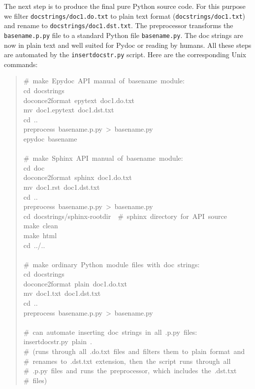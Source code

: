 \documentclass[a4paper,english]{article}
\begin{document}
The next step is to produce the final pure Python source code. For
this purpose we filter \texttt{docstrings/doc1.do.txt} to plain text format
(\texttt{docstrings/doc1.txt}) and rename to \texttt{docstrings/doc1.dst.txt}. The
preprocessor transforms the \texttt{basename.p.py} file to a standard Python
file \texttt{basename.py}. The doc strings are now in plain text and well
suited for Pydoc or reading by humans. All these steps are automated
by the \texttt{insertdocstr.py} script.  Here are the corresponding Unix
commands:
%
\begin{quote}{\ttfamily \raggedright \noindent
\#~make~Epydoc~API~manual~of~basename~module:\\
cd~docstrings\\
doconce2format~epytext~doc1.do.txt\\
mv~doc1.epytext~doc1.dst.txt\\
cd~..\\
preprocess~basename.p.py~>~basename.py\\
epydoc~basename\\
~\\
\#~make~Sphinx~API~manual~of~basename~module:\\
cd~doc\\
doconce2format~sphinx~doc1.do.txt\\
mv~doc1.rst~doc1.dst.txt\\
cd~..\\
preprocess~basename.p.py~>~basename.py\\
cd~docstrings/sphinx-rootdir~~\#~sphinx~directory~for~API~source\\
make~clean\\
make~html\\
cd~../..\\
~\\
\#~make~ordinary~Python~module~files~with~doc~strings:\\
cd~docstrings\\
doconce2format~plain~doc1.do.txt\\
mv~doc1.txt~doc1.dst.txt\\
cd~..\\
preprocess~basename.p.py~>~basename.py\\
~\\
\#~can~automate~inserting~doc~strings~in~all~.p.py~files:\\
insertdocstr.py~plain~.\\
\#~(runs~through~all~.do.txt~files~and~filters~them~to~plain~format~and\\
\#~renames~to~.dst.txt~extension,~then~the~script~runs~through~all\\
\#~.p.py~files~and~runs~the~preprocessor,~which~includes~the~.dst.txt\\
\#~files)
}
\end{quote}
\end{document}
